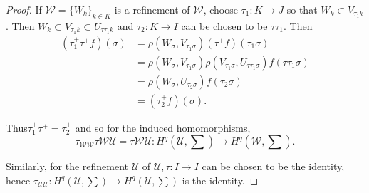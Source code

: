 \begin{proof}%
If $\mathscr{W} = \big\{W_k \big\}_{k \in K}$ is a refinement of $\mathscr{W}$,
choose $\tau_1 : K \to J$ so that $W_k \subset V_{\tau_1 k}$. Then
$W_k \subset V_{\tau_1 k} \subset U_{\tau \tau_1 k}$ and $\tau_2 : K
\to I$ can be chosen to be $\tau \tau_1$. Then 
\begin{align*}
(\tau^+_1 \tau^+ f) (\sigma) & = \rho(W_\sigma , V_{\tau_1 \sigma})
  (\tau^+ f) (\tau_1 \sigma)\\ 
& = \rho(W_\sigma , V_{\tau_1 \sigma}) \rho (V_{\tau_1 \sigma},
  U_{\tau \tau_1 \sigma}) f(\tau \tau_1 \sigma)\\ 
& = \rho(W_\sigma , U_{\tau_2 \sigma}) f(\tau_2 \sigma)\\ 
& = (\tau^+_2 f)(\sigma).
\end{align*}

Thus\pageoriginale $\tau^+_1 \tau^+ = \tau^+_2$ and so for the induced
homomorphisms, 
$$
\tau_{\mathscr{W} \mathscr{W}} \tau{\mathscr{W} \mathscr{U}} = 
\tau{\mathscr{W} \mathscr{U}} : H^q (\mathscr{U} , \sum) \to H^q
(\mathscr{W} , \sum). 
$$

Similarly, for the refinement $\mathscr{U}$ of $\mathscr{U}, \tau : I
\to I$ can be chosen to be the identity, hence $\tau_{\mathscr{U}
  \mathscr{U}} : H^q (\mathscr{U}, \sum) \to H^q (\mathscr{U}, \sum)$
is the identity. 
\end{proof}
~

\phantom{a}


